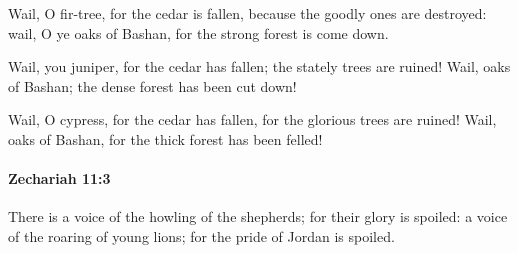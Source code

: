 			\begin{versebox}
					\item[BHS] 
					\item[LXX] 
					\item[ASV] Wail, O fir-tree, for the cedar is fallen, because the goodly ones are destroyed: wail, O ye oaks of Bashan, for the strong forest is come down.
					\item[NIV] Wail, you juniper, for the cedar has fallen; the stately trees are ruined! Wail, oaks of Bashan; the dense forest has been cut down!
					\item[NRSV] Wail, O cypress, for the cedar has fallen, for the glorious trees are ruined! Wail, oaks of Bashan, for the thick forest has been felled!
			\end{versebox}

		\paragraph{Zechariah 11:3} %
			\label{ZECHARIAH-11-3}

			There is a voice of the howling of the shepherds; for their glory is spoiled: a voice of the roaring of young lions; for the pride of Jordan is spoiled.

